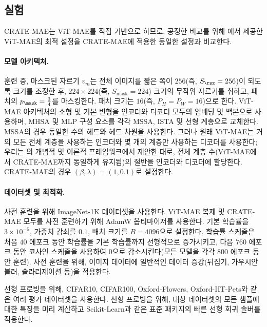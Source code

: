 \documentclass[../../book-main_ko.tex]{subfiles}
\begin{document}
\subsection{실험}
\label{sub:image_completion_experiments}

CRATE-MAE는 ViT-MAE를 직접 기반으로 하므로, 공정한 비교를 위해 \citep{he2022masked}에서 제공한 ViT-MAE의 최적 설정을 CRATE-MAE에 적용한 동일한 설정과 비교한다.

\paragraph{모델 아키텍처.} 훈련 중, 마스크된 자르기 \(v_{m}\)는 전체 이미지를 짧은 쪽이 \(256\)(즉, \(S_{\rsz} = 256\))이 되도록 크기를 조정한 후, \(224 \times 224\)(즉, \(S_{\mathrm{mask}} = 224\)) 크기의 무작위 자르기를 취하고, 패치의 \(p_{\mask} = \frac{3}{4}\)를 마스킹한다. 패치 크기는 \(16\)(즉, \(P_{H} = P_{W} = 16\))으로 한다. ViT-MAE 아키텍처의 소형 및 기본 변형을 인코더와 디코더 모두의 임베딩 및 백본으로 사용하며, MHSA 및 MLP 구성 요소를 각각 MSSA, ISTA 및 선형 계층으로 교체한다. MSSA의 경우 동일한 수의 헤드와 헤드 차원을 사용한다. 그러나 원래 ViT-MAE는 거의 모든 전체 계층을 사용하는 인코더와 몇 개의 계층만 사용하는 디코더를 사용한다; 우리는 의 개념적 및 이론적 프레임워크에서 제안한 대로, 전체 계층 수(ViT-MAE에서 CRATE-MAE까지 동일하게 유지됨)의 절반을 인코더와 디코더에 할당한다. CRATE-MAE의 경우 \((\beta, \lambda) = (1, 0.1)\)로 설정한다.

\paragraph{데이터셋 및 최적화.} 사전 훈련을 위해 ImageNet-1K 데이터셋을 사용한다. ViT-MAE 복제 및 CRATE-MAE 모두를 사전 훈련하기 위해 AdamW 옵티마이저를 사용한다. 기본 학습률을 \(3 \times 10^{-5}\), 가중치 감쇠를 \(0.1\), 배치 크기를 \(B = 4096\)으로 설정한다. 학습률 스케줄은 처음 \(40\) 에포크 동안 학습률을 기본 학습률까지 선형적으로 증가시키고, 다음 \(760\) 에포크 동안 코사인 스케줄을 사용하여 \(0\)으로 감소시킨다(모든 모델을 각각 \(800\) 에포크 동안 훈련). 사전 훈련을 위해, 이미지 데이터에 일반적인 데이터 증강(뒤집기, 가우시안 블러, 솔라리제이션 등)을 적용한다.

선형 프로빙을 위해, CIFAR10, CIFAR100, Oxford-Flowers, Oxford-IIT-Pets와 같은 여러 평가 데이터셋을 사용한다. 선형 프로빙을 위해, 대상 데이터셋의 모든 샘플에 대한 특징을 미리 계산하고 Scikit-Learn과 같은 표준 패키지의 빠른 선형 회귀 솔버를 적용한다.
\end{document}
